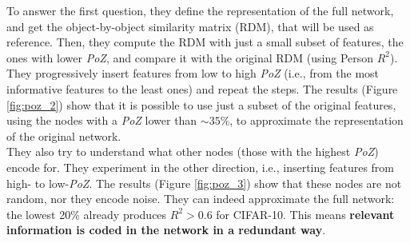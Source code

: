 To answer the first question, they define the representation of the full network, and get the object-by-object similarity matrix (RDM), that will be used as reference. Then, they compute the RDM with just a small subset of features, the ones with lower \textit{PoZ}, and compare it with the original RDM (using Person $R^2$). They progressively insert features from low to high \textit{PoZ} (i.e., from the most informative features to the least ones) and repeat the steps. The results (Figure \ref{fig:poz_2}) show that it is possible to use just a subset of the original features, using the nodes with a \textit{PoZ} lower than $\sim35\%$, to approximate the representation of the original network.\\

They also try to understand what other nodes (those with the highest \textit{PoZ}) encode for. They experiment in the other direction, i.e., inserting features from high- to low-\textit{PoZ}. The results (Figure \ref{fig:poz_3}) show that these nodes are not random, nor they encode noise. They can indeed approximate the full network: the lowest 20\% already produces $R^2>0.6$ for CIFAR-10. This means \textbf{relevant information is coded in the network in a redundant way}.


